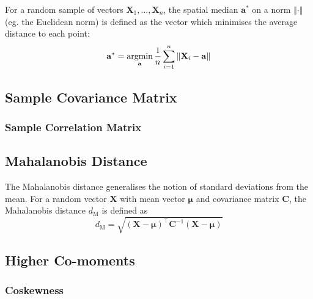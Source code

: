 \documentclass[11pt]{report} %
\begin{document}
For a random sample of vectors $\mathbf{X}_{1}, \dots, \mathbf{X}_{n}$, the spatial median $\mathbf{a}^{*}$ on a norm $\left\Vert\cdot\right\Vert$ (eg. the Euclidean norm) is defined as the vector which minimises the average distance to each point:
\begin{equation}
\mathbf{a}^{*} = \operatorname*{argmin}_{\mathbf{a}} \dfrac{1}{n}\sum_{i = 1}^{n}\left\Vert \mathbf{X}_{i} - \mathbf{a}\right\Vert
\end{equation}

\subsection{Sample Covariance Matrix}

\subsubsection{Sample Correlation Matrix}

\subsection{Mahalanobis Distance}

The Mahalanobis distance generalises the notion of standard deviations from the mean. For a random vector $\mathbf{X}$ with mean vector $\boldsymbol{\mu}$ and covariance matrix $\mathbf{C}$, the Mahalanobis distance $d_{\mathrm{M}}$ is defined as
\begin{equation}
d_{\mathrm{M}} = \sqrt{\left(\mathbf{X} - \boldsymbol{\mu}\right)^{\top}\mathbf{C}^{-1}\left(\mathbf{X} - \boldsymbol{\mu}\right)}
\end{equation}

\subsection{Higher Co-moments}

\subsubsection{Coskewness}
\end{document}
